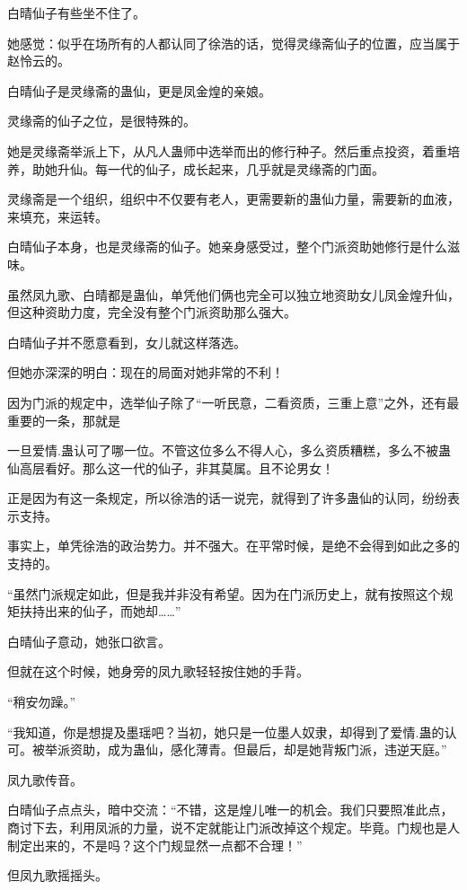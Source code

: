 \begin{this_body}
白晴仙子有些坐不住了。

她感觉：似乎在场所有的人都认同了徐浩的话，觉得灵缘斋仙子的位置，应当属于赵怜云的。

白晴仙子是灵缘斋的蛊仙，更是凤金煌的亲娘。

灵缘斋的仙子之位，是很特殊的。

她是灵缘斋举派上下，从凡人蛊师中选举而出的修行种子。然后重点投资，着重培养，助她升仙。每一代的仙子，成长起来，几乎就是灵缘斋的门面。

灵缘斋是一个组织，组织中不仅要有老人，更需要新的蛊仙力量，需要新的血液，来填充，来运转。

白晴仙子本身，也是灵缘斋的仙子。她亲身感受过，整个门派资助她修行是什么滋味。

虽然凤九歌、白晴都是蛊仙，单凭他们俩也完全可以独立地资助女儿凤金煌升仙，但这种资助力度，完全没有整个门派资助那么强大。

白晴仙子并不愿意看到，女儿就这样落选。

但她亦深深的明白：现在的局面对她非常的不利！

因为门派的规定中，选举仙子除了“一听民意，二看资质，三重上意”之外，还有最重要的一条，那就是

一旦爱情.蛊认可了哪一位。不管这位多么不得人心，多么资质糟糕，多么不被蛊仙高层看好。那么这一代的仙子，非其莫属。且不论男女！

正是因为有这一条规定，所以徐浩的话一说完，就得到了许多蛊仙的认同，纷纷表示支持。

事实上，单凭徐浩的政治势力。并不强大。在平常时候，是绝不会得到如此之多的支持的。

“虽然门派规定如此，但是我并非没有希望。因为在门派历史上，就有按照这个规矩扶持出来的仙子，而她却……”

白晴仙子意动，她张口欲言。

但就在这个时候，她身旁的凤九歌轻轻按住她的手背。

“稍安勿躁。”

“我知道，你是想提及墨瑶吧？当初，她只是一位墨人奴隶，却得到了爱情.蛊的认可。被举派资助，成为蛊仙，感化薄青。但最后，却是她背叛门派，违逆天庭。”

凤九歌传音。

白晴仙子点点头，暗中交流：“不错，这是煌儿唯一的机会。我们只要照准此点，商讨下去，利用凤派的力量，说不定就能让门派改掉这个规定。毕竟。门规也是人制定出来的，不是吗？这个门规显然一点都不合理！”

但凤九歌摇摇头。


\end{this_body}
